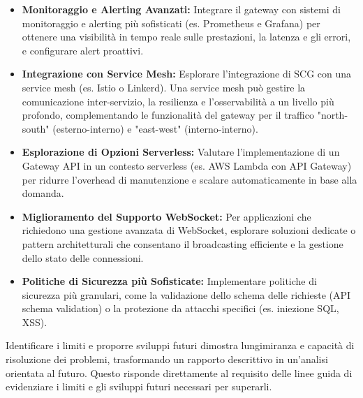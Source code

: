 \begin{itemize}
    \item \textbf{Monitoraggio e Alerting Avanzati:} Integrare il gateway con sistemi di monitoraggio e alerting più sofisticati (es. Prometheus e Grafana) per ottenere una visibilità in tempo reale sulle prestazioni, la latenza e gli errori, e configurare alert proattivi.
    \item \textbf{Integrazione con Service Mesh:} Esplorare l'integrazione di SCG con una service mesh (es. Istio o Linkerd). Una service mesh può gestire la comunicazione inter-servizio, la resilienza e l'osservabilità a un livello più profondo, complementando le funzionalità del gateway per il traffico "north-south" (esterno-interno) e "east-west" (interno-interno).
    \item \textbf{Esplorazione di Opzioni Serverless:} Valutare l'implementazione di un Gateway API in un contesto serverless (es. AWS Lambda con API Gateway) per ridurre l'overhead di manutenzione e scalare automaticamente in base alla domanda.
    \item \textbf{Miglioramento del Supporto WebSocket:} Per applicazioni che richiedono una gestione avanzata di WebSocket, esplorare soluzioni dedicate o pattern architetturali che consentano il broadcasting efficiente e la gestione dello stato delle connessioni.
    \item \textbf{Politiche di Sicurezza più Sofisticate:} Implementare politiche di sicurezza più granulari, come la validazione dello schema delle richieste (API schema validation) o la protezione da attacchi specifici (es. iniezione SQL, XSS).
\end{itemize}

Identificare i limiti e proporre sviluppi futuri dimostra lungimiranza e capacità di risoluzione dei problemi, trasformando un rapporto descrittivo in un'analisi orientata al futuro. Questo risponde direttamente al requisito delle linee guida di evidenziare i limiti e gli sviluppi futuri necessari per superarli.

